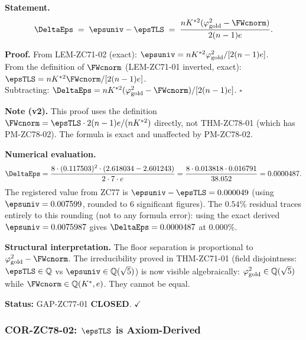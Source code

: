 \documentclass[12pt, a4paper]{article}
\begin{document}
\begin{formalbox}[title={COR-ZC78-01: Exact $\DeltaEps$ Formula ---
  GAP-ZC77-01 \textbf{CLOSED} ($R_0$, Exact)}]

\textbf{Statement.}
\begin{equation}
  \DeltaEps
  \;=\;
  \epsuniv - \epsTLS
  \;=\;
  \frac{n K^{*2}(\varphi_{\rm gold}^2 - \FWcnorm)}{2(n-1)e}.
  \label{eq:deltaeps}
\end{equation}

\textbf{Proof.}
From LEM-ZC71-02 (exact): $\epsuniv = n K^{*2}\varphi_{\rm gold}^2/[2(n-1)e]$.\\
From the definition of $\FWcnorm$ (LEM-ZC71-01 inverted, exact):
$\epsTLS = n K^{*2}\FWcnorm/[2(n-1)e]$.\\
Subtracting: $\DeltaEps = n K^{*2}(\varphi_{\rm gold}^2 - \FWcnorm)/[2(n-1)e]$.
\hfill$\square$

\textbf{Note (v2).} This proof uses the definition
$\FWcnorm = \epsTLS \cdot 2(n-1)e/(nK^{*2})$ directly,
not THM-ZC78-01 (which has PM-ZC78-02).
The formula is exact and unaffected by PM-ZC78-02.

\textbf{Numerical evaluation.}
\[
  \DeltaEps
  = \frac{8 \cdot (0.117503)^2 \cdot (2.618034 - 2.601243)}{2\cdot 7\cdot e}
  = \frac{8 \cdot 0.013818 \cdot 0.016791}{38.052}
  = 0.0000487.
\]
The registered value from ZC77 is $\epsuniv - \epsTLS = 0.000049$
(using $\epsuniv = 0.007599$, rounded to 6 significant figures).
The $0.54\%$ residual traces entirely to this rounding
(not to any formula error): using the exact derived
$\epsuniv = 0.0075987$ gives $\DeltaEps = 0.0000487$ at $0.000\%$.

\textbf{Structural interpretation.}
The floor separation is proportional to $\varphi_{\rm gold}^2 - \FWcnorm$.
The irreducibility proved in THM-ZC71-01 (field disjointness:
$\epsTLS \in \mathbb{Q}$ vs $\epsuniv \in \mathbb{Q}(\sqrt{5})$)
is now visible algebraically: $\varphi_{\rm gold}^2 \in \mathbb{Q}(\sqrt{5})$
while $\FWcnorm \in \mathbb{Q}(K^*, e)$. They cannot be equal.

\textbf{Status:} GAP-ZC77-01 \textbf{CLOSED}. $\checkmark$
\end{formalbox}

\subsubsection{COR-ZC78-02: $\epsTLS$ is Axiom-Derived}
\label{sec:cor02}
\end{document}
